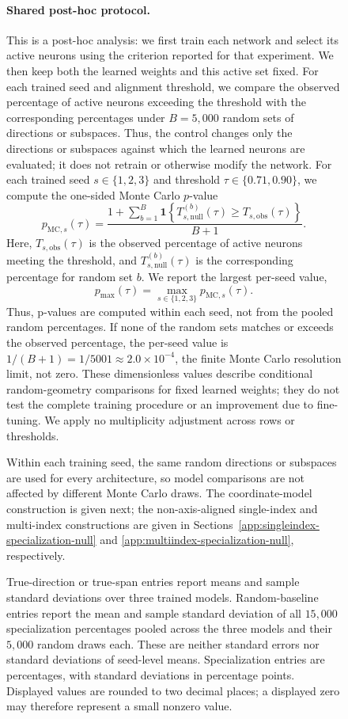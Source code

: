 \documentclass{article}
\newcounter{model}[section]
\begin{document}
\begin{figure}
\paragraph{Shared post-hoc protocol.}
This is a post-hoc analysis: we first train each network and select its active
neurons using the criterion reported for that experiment. We then keep both
the learned weights and this active set fixed. For each trained seed and
alignment threshold, we compare the observed percentage of active neurons
exceeding the threshold with the corresponding percentages under
\(B=5{,}000\) random sets of directions or subspaces. Thus, the control changes
only the directions or subspaces against which the learned neurons are
evaluated; it does not retrain
or otherwise modify the network. For each trained seed \(s\in\{1,2,3\}\)
and threshold \(\tau\in\{0.71,0.90\}\), we compute the one-sided Monte Carlo
\(p\)-value
\[
    p_{\mathrm{MC},s}(\tau)
    =
    \frac{1+\sum_{b=1}^{B}
    \mathbf 1\!\left\{T_{s,\mathrm{null}}^{(b)}(\tau)\geq T_{s,\mathrm{obs}}(\tau)\right\}}
    {B+1}.
\]
Here, \(T_{s,\mathrm{obs}}(\tau)\) is the observed percentage of active
neurons meeting the threshold, and \(T_{s,\mathrm{null}}^{(b)}(\tau)\) is
the corresponding percentage for random set \(b\).
We report the largest per-seed value,
\[
    p_{\max}(\tau)=\max_{s\in\{1,2,3\}}p_{\mathrm{MC},s}(\tau).
\]
Thus, p-values are computed within each seed, not from the pooled random
percentages. If none of the random sets matches or exceeds the observed
percentage, the per-seed value is \(1/(B+1)=1/5001\approx2.0\times10^{-4}\),
the finite Monte Carlo resolution limit, not zero.
These dimensionless values describe conditional random-geometry comparisons
for fixed learned weights; they do not test the complete training procedure
or an improvement due to fine-tuning. We apply no multiplicity adjustment
across rows or thresholds.

Within each training seed, the same random directions or subspaces are used
for every architecture, so model comparisons are not affected by different
Monte Carlo draws. The coordinate-model construction is given next; the
non-axis-aligned single-index and multi-index constructions are given in
Sections~\ref{app:singleindex-specialization-null} and
\ref{app:multiindex-specialization-null}, respectively.

True-direction or true-span entries report means and sample standard
deviations over three trained models. Random-baseline entries report the
mean and sample standard deviation of all \(15{,}000\) specialization
percentages pooled across the three models and their \(5{,}000\) random
draws each. These are neither standard errors nor standard deviations of
seed-level means. Specialization entries are percentages, with standard
deviations in percentage points. Displayed values are rounded to two
decimal places; a displayed zero may therefore represent a small nonzero
value.


\end{figure}
\end{document}
